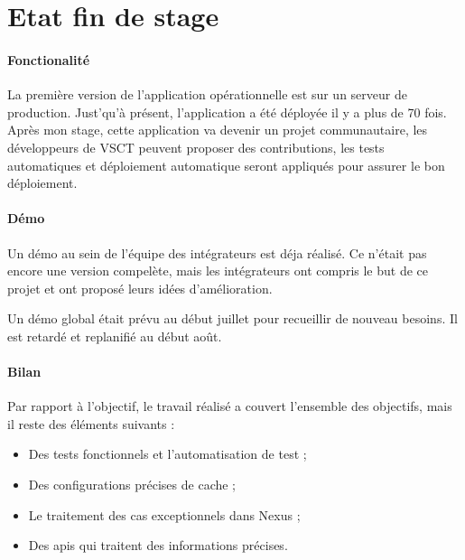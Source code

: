 \section{Etat fin de stage}

\paragraph{Fonctionalité}
La première version de l'application opérationnelle est sur un serveur de production.
Just'qu'à présent, l'application a été déployée il y a plus de 70 fois.
Après mon stage, cette application va devenir un projet communautaire,
les développeurs de VSCT peuvent proposer des contributions,
les tests automatiques et déploiement automatique seront appliqués pour assurer le bon déploiement.

\paragraph{Démo}
Un démo au sein de l'équipe des intégrateurs est déja réalisé.
Ce n'était pas encore une version compelète, mais les intégrateurs ont compris le but de ce projet et ont proposé leurs idées d'amélioration.

Un démo global était prévu au début juillet pour recueillir de nouveau besoins. Il est retardé et replanifié au début août.

\paragraph{Bilan}
Par rapport à l'objectif, le travail réalisé a couvert l'ensemble des objectifs, mais il reste des éléments suivants :
\begin{itemize}
  \item Des tests fonctionnels et l'automatisation de test ;
  \item Des configurations précises de cache ;
  \item Le traitement des cas exceptionnels dans Nexus ;
  \item Des apis qui traitent des informations précises.
\end{itemize}

\clearpage
